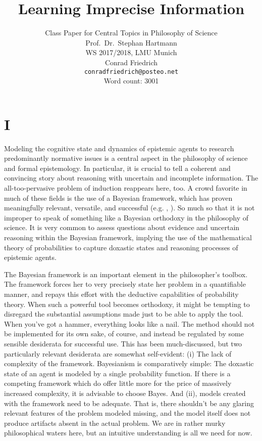 \documentclass[11pt, a4paper]{scrartcl}
\title{\osfamily{}Learning Imprecise Information}
\author{Class Paper for Central Topics in Philosophy of Science \\ Prof.\ Dr.\ Stephan Hartmann \\ WS 2017/2018, LMU Munich \\ Conrad Friedrich \\ \texttt{conradfriedrich@posteo.net} \\ Word count: 3001}
\begin{document}
\maketitle
\thispagestyle{empty}
\newpage
\section{I}
Modeling the cognitive state and dynamics of epistemic agents to research predominantly normative issues is a central aspect in the philosophy of science and formal epistemology. In particular, it is crucial to tell a coherent and convincing story about reasoning with uncertain and incomplete information. The all-too-pervasive problem of induction reappears here, too. A crowd favorite in much of these fields is the use of a Bayesian framework, which has proven meaningfully relevant, versatile, and successful (e.g. \citet{Bovens2003-HARBE}, \citet{Hartmann2017}). So much so that it is not improper to speak of something like a Bayesian orthodoxy in the philosophy of science. It is very common to assess questions about evidence and uncertain reasoning within the Bayesian framework, implying the use of the mathematical theory of probabilities to capture doxastic states and reasoning processes of epistemic agents.

The Bayesian framework is an important element in the philosopher's toolbox. The framework forces her to very precisely state her problem in a quantifiable manner, and repays this effort with the deductive capabilities of probability theory. When such a powerful tool becomes orthodoxy, it might be tempting to disregard the substantial assumptions made just to be able to apply the tool. When you've got a hammer, everything looks like a nail. The method should not be implemented for its own sake, of course, and instead be regulated by some sensible desiderata for successful use. This has been much-discussed, but two particularly relevant desiderata are somewhat self-evident: (i) The lack of complexity of the framework. Bayesianism is comparatively simple: The doxastic state of an agent is modeled by a single probability function. If there is a competing framework which do offer little more for the price of massively increased complexity, it is advisable to choose Bayes. And (ii), models created with the framework need to be adequate. That is, there shouldn't be any glaring relevant features of the problem modeled missing, and the model itself does not produce artifacts absent in the actual problem. We are in rather murky philosophical waters here, but an intuitive understanding is all we need for now. 
\end{document}
